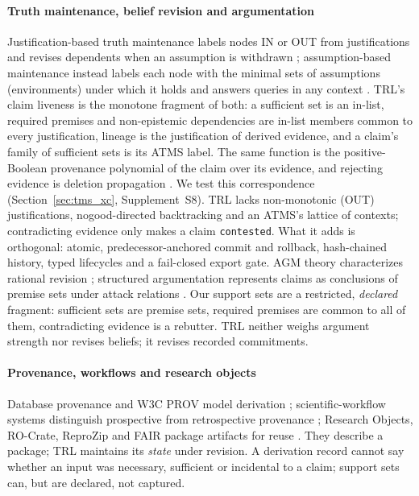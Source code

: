 \documentclass[cmc,article,submit,moreauthors,pdftex]{Definitions/tsp}
\newcommand{\suppl}[1]{Supplement~#1}
\begin{document}
\paragraph{Truth maintenance, belief revision and argumentation}
Justification-based truth maintenance labels nodes IN or OUT from justifications and revises dependents when an assumption is withdrawn \cite{doyle1979tms}; assumption-based maintenance instead labels each node with the minimal sets of assumptions (environments) under which it holds and answers queries in any context \cite{dekleer1986atms}. TRL's claim liveness is the monotone fragment of both: a sufficient set is an in-list, required premises and non-epistemic dependencies are in-list members common to every justification, lineage is the justification of derived evidence, and a claim's family of sufficient sets is its ATMS label. The same function is the positive-Boolean provenance polynomial of the claim over its evidence, and rejecting evidence is deletion propagation \cite{buneman2001provenance,green2007provenance}. We test this correspondence (Section~\ref{sec:tms_xc}, \suppl{S8}). TRL lacks non-monotonic (OUT) justifications, nogood-directed backtracking and an ATMS's lattice of contexts; contradicting evidence only makes a claim \texttt{contested}. What it adds is orthogonal: atomic, predecessor-anchored commit and rollback, hash-chained history, typed lifecycles and a fail-closed export gate. AGM theory characterizes rational revision \cite{alchourron1985agm}; structured argumentation represents claims as conclusions of premise sets under attack relations \cite{toulmin1958uses,dung1995acceptability,modgil2014aspic}. Our support sets are a restricted, \emph{declared} fragment: sufficient sets are premise sets, required premises are common to all of them, contradicting evidence is a rebutter. TRL neither weighs argument strength nor revises beliefs; it revises recorded commitments.

\paragraph{Provenance, workflows and research objects}
Database provenance and W3C PROV model derivation \cite{buneman2001provenance,green2007provenance,w3c2013prov}; scientific-workflow systems distinguish prospective from retrospective provenance \cite{davidson2008provenance,simmhan2005survey}; Research Objects, RO-Crate, ReproZip and FAIR package artifacts for reuse \cite{bechhofer2013linked,soilandreyes2022rocrate,chirigati2016reprozip,wilkinson2016fair}. They describe a package; TRL maintains its \emph{state} under revision. A derivation record cannot say whether an input was necessary, sufficient or incidental to a claim; support sets can, but are declared, not captured.
\end{document}
